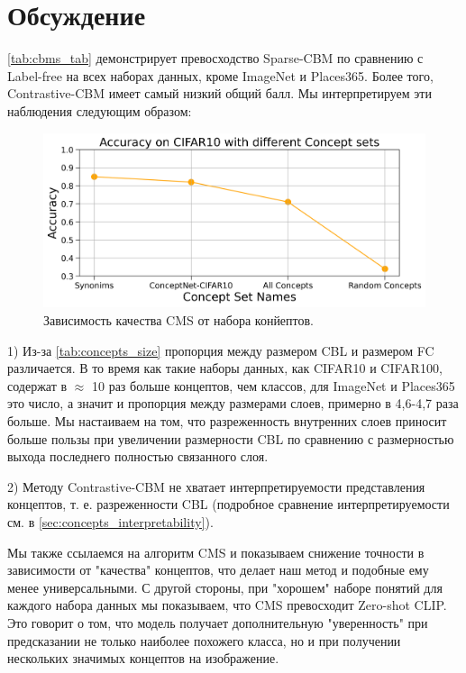 \section{Обсуждение}\label{sec:disc}

\cref{tab:cbms_tab} демонстрирует превосходство Sparse-CBM по сравнению с Label-free на всех наборах данных, кроме ImageNet и Places365. Более того, Contrastive-CBM имеет самый низкий общий балл. Мы интерпретируем эти наблюдения следующим образом:

\begin{figure}[t]
\begin{center}
\centerline{\includegraphics[width=\columnwidth]{./figures/cms_acc_cifar10.png}}
\caption{Зависимость качества CMS от набора конйептов.}
\label{fig:cms_acc}
\end{center}
\end{figure}



1) Из-за \cref{tab:concepts_size} пропорция между размером CBL и размером FC различается. В то время как такие наборы данных, как CIFAR10 и CIFAR100, содержат в $\approx$ 10 раз больше концептов, чем классов, для ImageNet и Places365 это число, а значит и пропорция между размерами слоев, примерно в 4,6-4,7 раза больше. Мы настаиваем на том, что разреженность внутренних слоев приносит больше пользы при увеличении размерности CBL по сравнению с размерностью выхода последнего полностью связанного слоя.

2) Методу Contrastive-CBM не хватает интерпретируемости представления концептов, т. е. разреженности CBL (подробное сравнение интерпретируемости см. в \cref{sec:concepts_interpretability}).

Мы также ссылаемся на алгоритм CMS и показываем снижение точности в зависимости от "качества" концептов, что делает наш метод и подобные ему менее универсальными. С другой стороны, при "хорошем" наборе понятий для каждого набора данных мы показываем, что CMS превосходит Zero-shot CLIP. Это говорит о том, что модель получает дополнительную "уверенность" при предсказании не только наиболее похожего класса, но и при получении нескольких значимых концептов на изображение.


